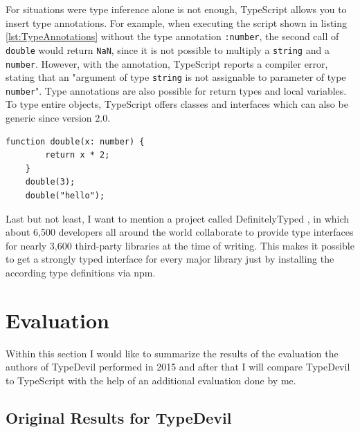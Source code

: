\documentclass[runningheads,a4paper]{llncs}
\begin{document}
For situations were type inference alone is not enough, TypeScript allows you to insert type annotations.
For example, when executing the script shown in listing \ref{lst:TypeAnnotations} without the type annotation \lstinline[columns=fixed]{:number}, the second call of \lstinline[columns=fixed]{double} would return \lstinline[columns=fixed]{NaN}, since it is not possible to multiply a \lstinline[columns=fixed]{string} and a \lstinline[columns=fixed]{number}.
However, with the annotation, TypeScript reports a compiler error, stating that an "argument of type \lstinline[columns=fixed]{string} is not assignable to parameter of type \lstinline[columns=fixed]{number}".
Type annotations are also possible for return types and local variables.
To type entire objects, TypeScript offers classes and interfaces which can also be generic since version 2.0.

\medskip\medskip
\lstset{language=javascript}
\begin{minipage}{\linewidth}
\begin{lstlisting}[frame=single, caption=Type Annotations, label={lst:TypeAnnotations}]
    function double(x: number) {
        return x * 2;
    }
    double(3);
    double("hello");
\end{lstlisting}
\end{minipage}

Last but not least, I want to mention a project called DefinitelyTyped \cite{DefinitelyTyped}, in which about 6,500 developers all around the world collaborate to provide type interfaces for nearly 3,600 third-party libraries at the time of writing.
This makes it possible to get a strongly typed interface for every major library just by installing the according type definitions via npm.

\section{Evaluation}

Within this section I would like to summarize the results of the evaluation the authors of TypeDevil performed in 2015 and after that I will compare TypeDevil to TypeScript with the help of an additional evaluation done by me.

\subsection{Original Results for TypeDevil}
\end{document}
